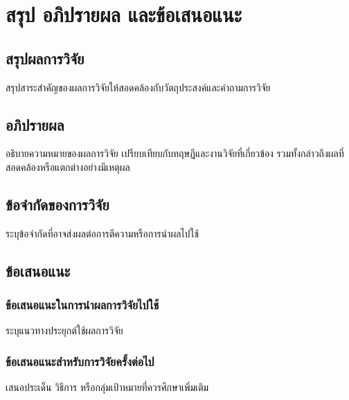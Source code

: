 \chapter{สรุป อภิปรายผล และข้อเสนอแนะ}
\section{สรุปผลการวิจัย}
สรุปสาระสำคัญของผลการวิจัยให้สอดคล้องกับวัตถุประสงค์และคำถามการวิจัย
\section{อภิปรายผล}
อธิบายความหมายของผลการวิจัย เปรียบเทียบกับทฤษฎีและงานวิจัยที่เกี่ยวข้อง
รวมทั้งกล่าวถึงผลที่สอดคล้องหรือแตกต่างอย่างมีเหตุผล
\section{ข้อจำกัดของการวิจัย}
ระบุข้อจำกัดที่อาจส่งผลต่อการตีความหรือการนำผลไปใช้
\section{ข้อเสนอแนะ}
\subsection{ข้อเสนอแนะในการนำผลการวิจัยไปใช้}
ระบุแนวทางประยุกต์ใช้ผลการวิจัย
\subsection{ข้อเสนอแนะสำหรับการวิจัยครั้งต่อไป}
เสนอประเด็น วิธีการ หรือกลุ่มเป้าหมายที่ควรศึกษาเพิ่มเติม
